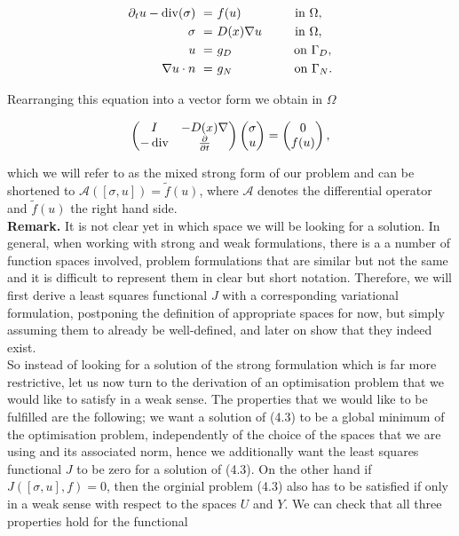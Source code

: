 \documentclass[../draft_1.tex]{subfiles}
\begin{document}
\begin{ceqn}
	\begin{equation}
	\begin{aligned}
	\label{mixed_form}
	 \partial_t u - \mathop{}\!\mathrm{div}(\sigma) \ =& \ f(u) \qquad \qquad \text{ in } \Omega, \\
	\sigma \ =& \ D(x)  \nabla u \ \qquad \text{ in } \Omega,  \\
	u \ =& \ g_D  \ \ \qquad  \qquad \text{ on } \Gamma_D, \\
	\nabla u \cdot n \ =& \ g_N  \ \ \qquad \qquad \text{ on } \Gamma_N.
	\end{aligned}
	\end{equation}
\end{ceqn}
Rearranging this equation into a vector form we obtain in $\Omega$
\begin{ceqn}
	\begin{equation}
	\begin{pmatrix}
	I & - D(x) \nabla \\
	- \mathop{}\!\mathrm{div} & \frac{\partial}{\partial t} 
	\end{pmatrix}
	\begin{pmatrix}
	\sigma \\
	u
	\end{pmatrix} = 
	\begin{pmatrix}
	0 \\
	f(u)
	\end{pmatrix},
	\end{equation}
\end{ceqn}
which we will refer to as the mixed strong form of our problem and can be shortened to $\mathcal{A} ([\sigma, u]) = \tilde{f}(u)$, where $\mathcal{A}$ denotes the differential operator and $\tilde{f}(u)$ the right hand side. 
\smallskip
\\
\textbf{Remark.} It is not clear yet in which space we will be looking for a solution. In general, when working with strong and weak formulations, there is a a number of function spaces involved, problem formulations that are similar but not the same and it is difficult to represent them in clear but short notation. Therefore, we will first derive a least squares functional $J$ with a corresponding variational formulation, postponing the definition of appropriate spaces for now, but simply assuming them to already be well-defined, and later on show that they indeed exist.
\smallskip
\\
So instead of looking for a solution of the strong formulation which is far more restrictive, let us now turn to the derivation of an optimisation problem that we would like to satisfy in a weak sense. The properties that we would like to be fulfilled are the following; we want a solution of (4.3) to be a global minimum of the optimisation problem, independently of the choice of the spaces that we are using and its associated norm, hence we additionally want the least squares functional $J$ to be zero for a solution of (4.3). On the other hand if $J([\sigma, u], f) = 0$, then the orginial problem (4.3) also has to be satisfied if only in a weak sense with respect to the spaces $U$ and $Y$. We can check that all three properties hold for the functional  
\end{document}

